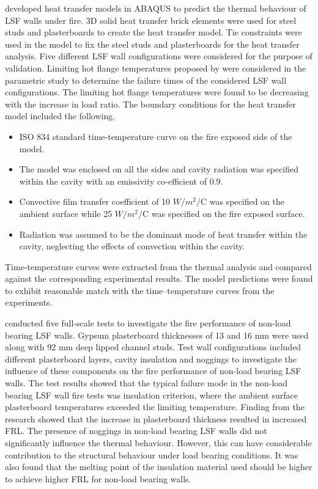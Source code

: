 \citet{Rusthi2017} developed heat transfer models in ABAQUS to predict the thermal behaviour of LSF walls under fire. 3D solid heat transfer brick elements were used for steel studs and plasterboards to create the heat transfer model. Tie constraints were used in the model to fix the steel studs and plasterboards for the heat transfer analysis. Five different LSF wall configurations were considered for the purpose of validation. Limiting hot flange temperatures proposed by \citet{Gunalan2013e,Ariyanayagam2014e} were considered in the parametric study to determine the failure times of the considered LSF wall configurations. The limiting hot flange temperatures were found to be decreasing with the increase in load ratio. The boundary conditions for the heat transfer model included the following.
\begin{itemize}
	\item ISO 834 standard time-temperature curve on the fire exposed side of the model.
	\item The model was enclosed on all the sides and cavity radiation was specified within the cavity with an emissivity co-efficient of 0.9.
	\item Convective film transfer coefficient of 10 $W/m^2/$\degree C was specified on the ambient surface while 25 $W/m^2/$\degree C was specified on the fire exposed surface.
	\item Radiation was assumed to be the dominant mode of heat transfer within the cavity, neglecting the effects of convection within the cavity.
\end{itemize}
Time-temperature curves were extracted from the thermal analysis and compared against the corresponding experimental results. The model predictions were found to exhibit reasonable match with the time–temperature curves from the experiments.

\citet{Ariyanayagam2018a} conducted five full-scale tests to investigate the fire performance of non-load bearing LSF walls. Gypsum plasterboard thicknesses of 13 and 16 mm were used along with 92 mm deep lipped channel studs. Test wall configurations included different plasterboard layers, cavity insulation and noggings to investigate the influence of these components on the fire performance of non-load bearing LSF walls. The test results showed that the typical failure mode in the non-load bearing LSF wall fire tests was insulation criterion, where the ambient surface plasterboard temperatures exceeded the limiting temperature. Finding from the research showed that the increase in plasterboard thickness resulted in increased FRL. The presence of noggings in non-load bearing LSF walls did not significantly influence the thermal behaviour. However, this can have considerable contribution to the structural behaviour under load bearing conditions. It was also found that the melting point of the insulation material used should be higher to achieve higher FRL for non-load bearing walls. 

